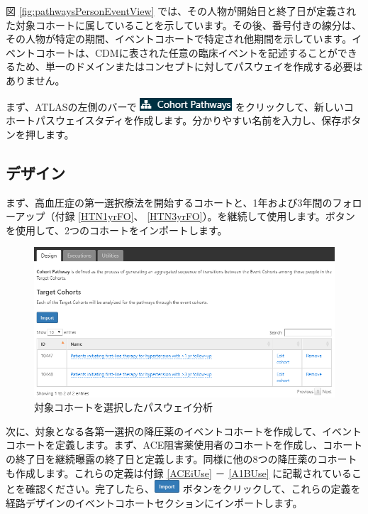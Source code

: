 \documentclass[
  11pt]{book}
\theoremstyle{definition}
\theoremstyle{definition}
\theoremstyle{definition}
\theoremstyle{definition}
\theoremstyle{remark}
\begin{document}
図 \ref{fig:pathwaysPersonEventView} では、その人物が開始日と終了日が定義された対象コホートに属していることを示しています。その後、番号付きの線分は、その人物が特定の期間、イベントコホートで特定され他期間を示しています。イベントコホートは、CDMに表された任意の臨床イベントを記述することができるため、単一のドメインまたはコンセプトに対してパスウェイを作成する必要はありません。

まず、ATLASの左側のバーで \includegraphics{images/Characterization/atlasPathwaysMenuItem.png} をクリックして、新しいコホートパスウェイスタディを作成します。分かりやすい名前を入力し、保存ボタンを押します。

\subsection{デザイン}\label{ux30c7ux30b6ux30a4ux30f3-1}

まず、高血圧症の第一選択療法を開始するコホートと、1年および3年間のフォローアップ（付録 \ref{HTN1yrFO}、 \ref{HTN3yrFO}）。を継続して使用します。ボタンを使用して、2つのコホートをインポートします。

\begin{figure}

{\centering \includegraphics[width=1\linewidth]{images/Characterization/atlasPathwaysTargetCohorts} 

}

\caption{対象コホートを選択したパスウェイ分析}\label{fig:atlasPathwaysTargetCohorts}
\end{figure}

次に、対象となる各第一選択の降圧薬のイベントコホートを作成して、イベントコホートを定義します。まず、ACE阻害薬使用者のコホートを作成し、コホートの終了日を継続曝露の終了日と定義します。同様に他の8つの降圧薬のコホートも作成します。これらの定義は付録 \ref{ACEiUse} － \ref{A1BUse} に記載されていることを確認ください。完了したら、\includegraphics{images/Characterization/atlasImportButton.png} ボタンをクリックして、これらの定義を経路デザインのイベントコホートセクションにインポートします。
\end{document}
